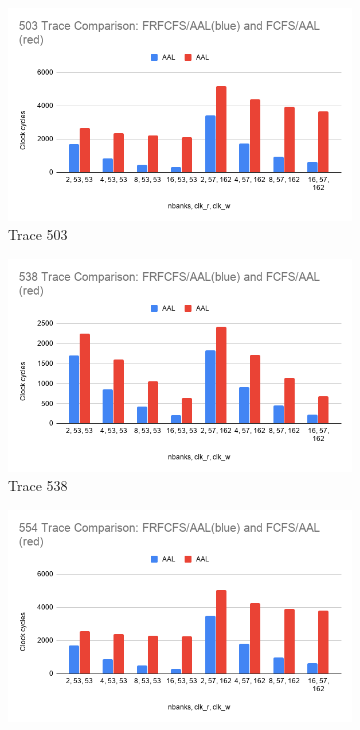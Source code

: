\documentclass[letterpaper, 11pt]{article}
\begin{document}
\begin{figure}[htbp!]
	\centering
	\begin{subfigure}[b]{.48\linewidth}
		\includegraphics[width=\textwidth]{503_results_graph.png}
		\caption{Trace 503}
		\label{fig6a}
	\end{subfigure}
	\hfill %
	\begin{subfigure}[b]{.48\linewidth}
		\includegraphics[width=\textwidth]{538_results_graph.png}
		\caption{Trace 538}
		\label{fig6b}
	\end{subfigure}
	\hfill %
	\begin{subfigure}[b]{.48\linewidth}
		\includegraphics[width=\textwidth]{554_results_graph.png}

\end{subfigure}
\end{figure}
\end{document}
